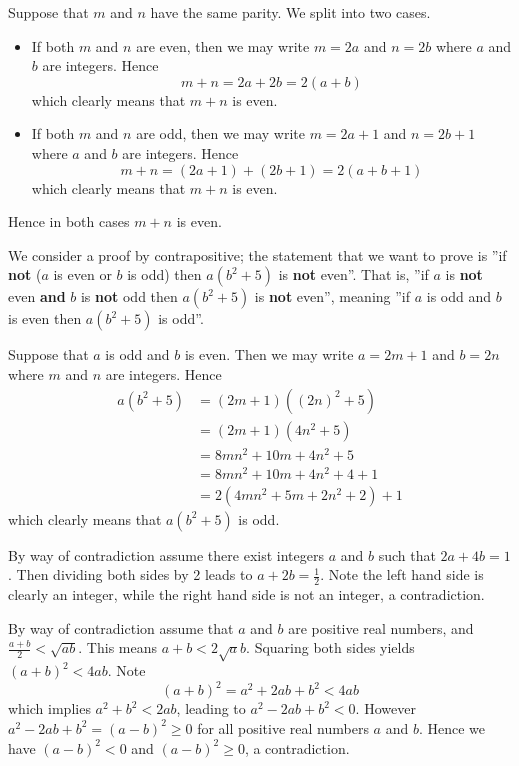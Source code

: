 \begin{questions}
    \item Suppose that $m$ and $n$ have the same parity. We split into two cases.
    \begin{itemize}
        \item If both $m$ and $n$ are even, then we may write $m = 2a$ and $n = 2b$ where $a$ and $b$ are integers. Hence
        \[
            m + n = 2a + 2b = 2(a+b)        
        \]
        which clearly means that $m + n$ is even.
        \item If both $m$ and $n$ are odd, then we may write $m = 2a + 1$ and $n = 2b + 1$ where $a$ and $b$ are integers. Hence
        \[
            m + n = (2a + 1) + (2b + 1) = 2(a + b + 1)        
        \]
        which clearly means that $m+n$ is even.
    \end{itemize}
    Hence in both cases $m + n$ is even.
    
    \item We consider a proof by contrapositive; the statement that we want to prove is ''if \textbf{not} ($a$ is even or $b$ is odd) then $a(b^2+5)$ is \textbf{not} even''. That is, ''if $a$ is \textbf{not} even \textbf{and} $b$ is \textbf{not} odd then $a(b^2+5)$ is \textbf{not} even'', meaning ''if $a$ is odd and $b$ is even then $a(b^2+5)$ is odd''.
    
    Suppose that $a$ is odd and $b$ is even. Then we may write $a = 2m + 1$ and $b = 2n$ where $m$ and $n$ are integers. Hence
    \begin{align*}
        a(b^2+5) &= (2m+1)\left((2n)^2 + 5\right)\\
        &= (2m+1)(4n^2 + 5)\\
        &= 8mn^2 + 10m + 4n^2 + 5\\
        &= 8mn^2 + 10m + 4n^2 + 4 + 1\\
        &= 2(4mn^2 + 5m + 2n^2 + 2) + 1
    \end{align*}
    which clearly means that $a(b^2+5)$ is odd.
    
    \item By way of contradiction assume there exist integers $a$ and $b$ such that $2a + 4b = 1$. Then dividing both sides by 2 leads to $a + 2b = \frac12$. Note the left hand side is clearly an integer, while the right hand side is not an integer, a contradiction.
    
    \item By way of contradiction assume that $a$ and $b$ are positive real numbers, and $\frac{a+b}{2} < \sqrt{ab}$. This means $a+b<2\sqrt ab$. Squaring both sides yields $(a+b)^2 < 4ab$. Note
    \[
        (a+b)^2 = a^2 + 2ab + b^2 < 4ab    
    \]
    which implies $a^2 + b^2 < 2ab$, leading to $a^2 - 2ab + b^2 < 0$. However $a^2 - 2ab + b^2 = (a-b)^2 \geq 0$ for all positive real numbers $a$ and $b$. Hence we have $(a-b)^2 < 0$ and $(a-b)^2 \geq 0$, a contradiction.
    

\end{questions}
